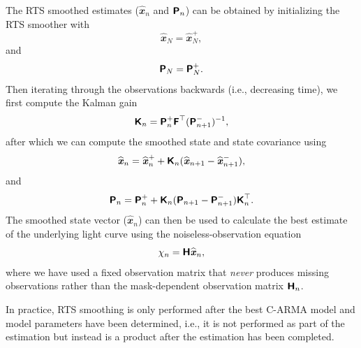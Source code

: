 \documentclass[a4paper,fleqn,usenatbib]{mnras}
\begin{document}
The RTS smoothed estimates ($\widehat{\mathbfit{x}}_{n}$ and $\textbf{\textsf{P}}_{n}$) can be obtained by initializing the RTS smoother with
\begin{equation}\label{eq:xRTSInit}
\widehat{\mathbfit{x}}_{N} = \widehat{\mathbfit{x}}^{+}_{N},
\end{equation}
and
\begin{equation}\label{eq:PRTSInit}
\textbf{\textsf{P}}_{N} = \textbf{\textsf{P}}^{+}_{N}.
\end{equation}
Then iterating through the observations backwards (i.e., decreasing time), we first compute the Kalman gain
\begin{equation}\label{eq:KalmanRTS}
\textbf{\textsf{K}}_{n} = \textbf{\textsf{P}}^{+}_{n} \textbf{\textsf{F}}^{\top} (\textbf{\textsf{P}}^{-}_{n+1})^{-1},
\end{equation}
after which we can compute the smoothed state and state covariance using 
\begin{equation}\label{eq:xRTS}
\widehat{\textbf{\textit{x}}}_{n} = \widehat{\textbf{\textit{x}}}^{+}_{n} + \textbf{\textsf{K}}_{n} (\widehat{\textbf{\textit{x}}}_{n+1} - \widehat{\textbf{\textit{x}}}^{-}_{n+1}),
\end{equation}
and
\begin{equation}\label{eq:PRTS}
\textbf{\textsf{P}}_{n} = \textbf{\textsf{P}}^{+}_{n} + \textbf{\textsf{K}}_{n} (\textbf{\textsf{P}}_{n+1} - \textbf{\textsf{P}}^{-}_{n+1}) \textbf{\textsf{K}}_{n}^{\top}.
\end{equation}
The smoothed state vector ($\widehat{\mathbfit{x}}_{n}$) can then be used to calculate the best estimate of the underlying light curve using the noiseless-observation equation
\begin{equation}\label{eq:NoiselessObsEq}
\chi_{n} = \textbf{\textsf{H}} \widehat{\textbf{\textit{x}}}_{n},
\end{equation}
where we have used a fixed observation matrix that \textit{never} produces missing observations rather than the mask-dependent observation matrix $\textbf{\textsf{H}}_{n}$. 

In practice, RTS smoothing is only performed after the best C-ARMA model and model parameters have been determined, i.e., it is not performed as part of the estimation but instead is a product after the estimation has been completed.

\end{document}
